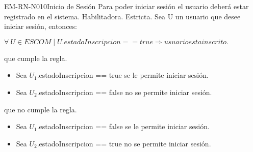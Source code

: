 \begin{BussinesRule}{EM-RN-N010}{Inicio de Sesión}
	\BRitem[Descripción:] Para poder iniciar sesión el usuario deberá estar registrado en el sistema.
	\BRitem[Tipo: ] Habilitadora.
	\BRitem[Nivel: ] Estricta.
	\BRitem[Sentenia: ] Sea U un usuario que desee iniciar sesión, entonces:
	\begin{center}
		$\forall \: U \in  ESCOM \mid U.estadoInscripcion == true \Rightarrow usuario esta inscrito.$
	\end{center}
	 que cumple la regla.
		\begin{itemize}
			\item Sea $U_{1}$.estadoInscripcion == true se le permite iniciar sesión.
			\item Sea $U_{2}$.estadoInscripcion == false no se permite iniciar sesión.
		\end{itemize}
	 que no cumple la regla.
		\begin{itemize}
			\item Sea $U_{1}$.estadoInscripcion == false se le permite iniciar sesión.
			\item Sea $U_{2}$.estadoInscripcion == true no se permite iniciar sesión.
		\end{itemize}
\end{BussinesRule}

